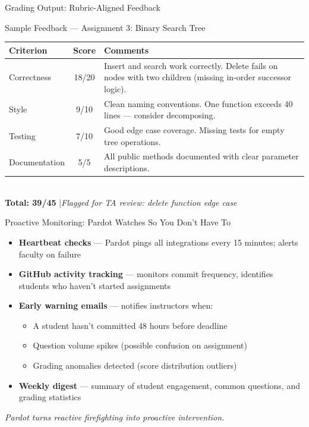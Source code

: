 \documentclass[aspectratio=169]{beamer}
\begin{document}
\begin{frame}{Grading Output: Rubric-Aligned Feedback}
\begin{exampleblock}{Sample Feedback --- Assignment 3: Binary Search Tree}
\small
\begin{tabular}{lcp{6cm}}
\toprule
\textbf{Criterion} & \textbf{Score} & \textbf{Comments} \\
\midrule
Correctness & 18/20 & Insert and search work correctly. Delete fails on nodes with two children (missing in-order successor logic). \\
\addlinespace
Style & 9/10 & Clean naming conventions. One function exceeds 40 lines --- consider decomposing. \\
\addlinespace
Testing & 7/10 & Good edge case coverage. Missing tests for empty tree operations. \\
\addlinespace
Documentation & 5/5 & All public methods documented with clear parameter descriptions. \\
\bottomrule
\end{tabular}
\vspace{0.3em}\\
\textbf{Total: 39/45} \quad|\quad \textit{Flagged for TA review: delete function edge case}
\end{exampleblock}
\end{frame}

\begin{frame}{Proactive Monitoring: Pardot Watches So You Don't Have To}
\begin{itemize}
  \item \textbf{Heartbeat checks} --- Pardot pings all integrations every 15 minutes; alerts faculty on failure
  \item \textbf{GitHub activity tracking} --- monitors commit frequency, identifies students who haven't started assignments
  \item \textbf{Early warning emails} --- notifies instructors when:
  \begin{itemize}
    \item A student hasn't committed 48 hours before deadline
    \item Question volume spikes (possible confusion on assignment)
    \item Grading anomalies detected (score distribution outliers)
  \end{itemize}
  \item \textbf{Weekly digest} --- summary of student engagement, common questions, and grading statistics
\end{itemize}
\vfill
\begin{center}
\textit{Pardot turns reactive firefighting into proactive intervention.}
\end{center}
\end{frame}
\end{document}
